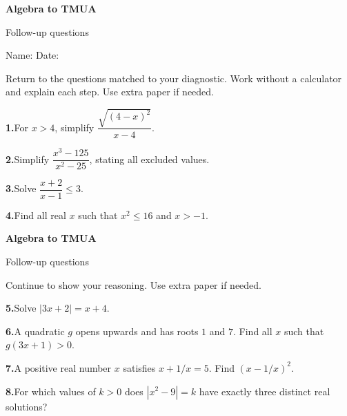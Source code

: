 \documentclass[11pt,a4paper]{article}
\begin{document}
{\LARGE\bfseries Algebra to TMUA}\par
{\large Follow-up questions}\par
Name: \hrulefill\qquad Date: \hrulefill\par
Return to the questions matched to your diagnostic. Work without a calculator and explain each step. Use extra paper if needed.\par
\vspace{4pt}\textbf{1.}\quad For \(x>4\), simplify \(\dfrac{\sqrt{(4-x)^2}}{x-4}\).\par\vfill
\vspace{4pt}\textbf{2.}\quad Simplify \(\dfrac{x^3-125}{x^2-25}\), stating all excluded values.\par\vfill
\vspace{4pt}\textbf{3.}\quad Solve \(\dfrac{x+2}{x-1}\leq3\).\par\vfill
\vspace{4pt}\textbf{4.}\quad Find all real \(x\) such that \(x^2\leq16\) and \(x>-1\).\par\vfill
\vspace{8mm}
\newpage
{\LARGE\bfseries Algebra to TMUA}\par
{\large Follow-up questions}\par
{\small Continue to show your reasoning. Use extra paper if needed.}\par
\vspace{4pt}\textbf{5.}\quad Solve \(|3x+2|=x+4\).\par\vfill
\vspace{4pt}\textbf{6.}\quad A quadratic \(g\) opens upwards and has roots \(1\) and \(7\). Find all \(x\) such that \(g(3x+1)>0\).\par\vfill
\vspace{4pt}\textbf{7.}\quad A positive real number \(x\) satisfies \(x+1/x=5\). Find \((x-1/x)^2\).\par\vfill
\vspace{4pt}\textbf{8.}\quad For which values of \(k>0\) does \(|x^2-9|=k\) have exactly three distinct real solutions?\par\vfill
\vspace{8mm}
\end{document}
